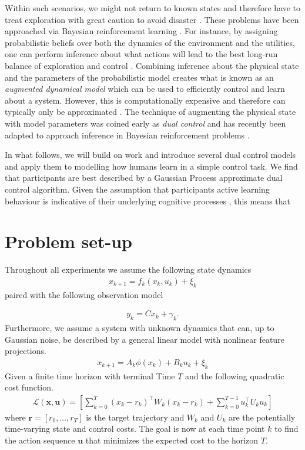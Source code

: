 \documentclass[10pt,letterpaper]{article}
\begin{document}
Within such scenarios, we might not return to known states and therefore have to treat exploration with great caution to avoid disaster \citep{klenske2015dual}. These problems have been approached via Bayesian reinforcement learning \citep{poupart2010bayesian}.  For instance, by assigning probabilistic beliefs over both the dynamics of the environment and the utilities, one can perform inference about what actions will lead to the best long-run balance of exploration and control \citep{duff2002optimal}. Combining inference about the physical state and the parameters of the probabilistic model creates what is known as an \textit{augmented dynamical model} which can be used to efficiently control and learn about a system.  However, this is computationally expensive \citep{hennig2011optimal} and therefore can typically only be approximated \citep{vlassis2012bayesian}. The technique of augmenting the physical state with model parameters was coined early as \emph{dual control} \citep{feldbaum1960dual} and has recently been adapted to approach inference in Bayesian reinforcement problems \citep{klenske2015dual}.
 
In what follows, we will build on \cite{klenske2015dual} work and introduce several dual control models and apply them to modelling how humans learn in a simple control task. We find that participants are best described by a Gaussian Process approximate dual control algorithm. Given the assumption that participants active learning behaviour is indicative of their underlying cognitive processes \citep{parpart2015active}, this means that

\section{Problem set-up}
Throughout all experiments we assume the following state dynamics
\begin{align*}
x_{k+1}=f_k(x_k, u_k)+\xi_k
\end{align*}
paired with the following observation model

\begin{align*}
y_k=Cx_k+\gamma_k.
\end{align*}
Furthermore, we assume a system with unknown dynamics that can, up to Gaussian noise, be described by a general linear model with nonlinear feature projections. 
\begin{align*}
x_{k+1}=A_k \phi(x_k)+B_ku_k+\xi_k
\end{align*}
Given a finite time horizon with terminal Time $T$ and the following quadratic cost function.
\begin{align*}
\mathcal{L}(\mathbf{x,u})=\left[\sum_{k=0}^T(x_k-r_k)^\top W_k(x_k-r_k)+\sum_{k=0}^{T-1}u_k^\top U_ku_k \right]
\end{align*}
where $\mathbf{r}=[r_0, \dots, r_T]$ is the target trajectory and $W_k$ and $U_k$ are the potentially time-varying state and control costs. The goal is now at each time point $k$ to find the action sequence $\mathbf{u}$ that minimizes the expected cost to the horizon $T$.
\end{document}
